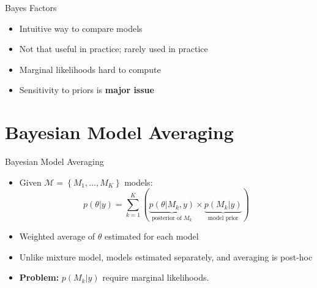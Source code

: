 \documentclass[ignorenonframetext,]{beamer}
\providecommand{\tightlist}{%
  \setlength{\itemsep}{0pt}\setlength{\parskip}{0pt}}
\begin{document}
\begin{frame}{Bayes Factors}
\protect\hypertarget{bayes-factors-1}{}

\begin{itemize}
\tightlist
\item
  Intuitive way to compare models
\item
  Not that useful in practice; rarely used in practice
\item
  Marginal likelihoods hard to compute
\item
  Sensitivity to priors is \textbf{major issue}
\end{itemize}

\end{frame}

\hypertarget{bayesian-model-averaging}{%
\section{Bayesian Model Averaging}\label{bayesian-model-averaging}}

\begin{frame}{Bayesian Model Averaging}
\protect\hypertarget{bayesian-model-averaging-1}{}

\begin{itemize}
\item
  Given \(\mathcal{M} = \left\{M_1, \dots, M_K \right\}\) models: \[
  p(\theta | y) = \sum_{k = 1}^K \left( \underbrace{p(\theta| M_k, y)}_{\text{posterior of } M_{k}} \times \underbrace{p(M_k | y)}_{\text{model prior}} \right)
  \]
\item
  Weighted average of \(\theta\) estimated for each model
\item
  Unlike mixture model, models estimated separately, and averaging is
  post-hoc
\item
  \textbf{Problem:} \(p(M_k | y)\) require marginal likelihoods.
\end{itemize}

\end{frame}
\end{document}
